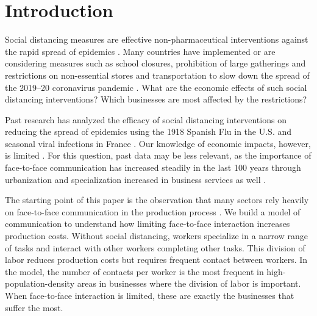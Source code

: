 \section*{Introduction}
Social distancing measures are effective non-pharmaceutical interventions against the rapid spread of epidemics \cite{Bootsma2007-ww,Markel2007-ad,Hatchett2007-gc,Wilder-Smith2020-jj}. Many countries have implemented or are considering measures such as school closures, prohibition of large gatherings and restrictions on non-essential stores and transportation to slow down the spread of the 2019--20 coronavirus pandemic \cite{Anderson2020-qk,Cohen2020-jw,Thompson2020-lc,noauthor_2020-xi}. What are the economic effects of such social distancing interventions? Which businesses are most affected by the restrictions?

Past research has analyzed the efficacy of social distancing interventions on reducing the spread of epidemics using the 1918 Spanish Flu in the U.S. \cite{Hatchett2007-gc,Markel2007-ad,Bootsma2007-ww} and seasonal viral infections in France \cite{Adda2016-mn}. Our knowledge of economic impacts, however, is limited \cite{Wren-Lewis2020-vc}. For this question, past data may be less relevant, as the importance of face-to-face communication has increased steadily in the last 100 years through urbanization \cite{Henderson2010-mv,Henderson2002-ji} and specialization increased in business services as well \cite{Herrendorf2014-jx,Duarte2019-kc}. 

The starting point of this paper is the observation that many sectors rely heavily on face-to-face communication in the production process \cite{Charlot2004-zr,Tian2019-wq}. We build a model of communication to understand how limiting face-to-face interaction increases production costs. Without social distancing, workers specialize in a narrow range of tasks and interact with other workers completing other tasks. This division of labor reduces production costs but requires frequent contact between workers. In the model, the number of contacts per worker is the most frequent in high-population-density areas in businesses where the division of labor is important. When face-to-face interaction is limited, these are exactly the businesses that suffer the most.

